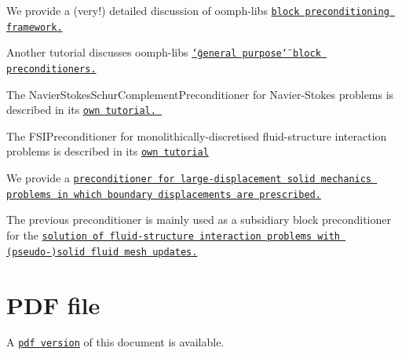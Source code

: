 \begin{DoxyItemize}
\item We provide a (very!) detailed discussion of {\ttfamily oomph-\/lib\textquotesingle{}s} \href{../../mpi/block_preconditioners/html/index.html}{\tt block preconditioning framework.} ~\newline
~\newline

\item Another tutorial discusses {\ttfamily oomph-\/lib\textquotesingle{}s} \href{../../mpi/distributed_general_purpose_block_preconditioners/html/index.html}{\tt \char`\"{}general purpose\char`\"{} block preconditioners.} ~\newline
~\newline

\item The Navier\+Stokes\+Schur\+Complement\+Preconditioner for Navier-\/\+Stokes problems is described in its \href{../../preconditioners/lsc_navier_stokes/html/index.html}{\tt own tutorial. } ~\newline
~\newline

\item The F\+S\+I\+Preconditioner for monolithically-\/discretised fluid-\/structure interaction problems is described in its \href{../../preconditioners/fsi/html/index.html}{\tt own tutorial} ~\newline
~\newline

\item We provide a \href{../../preconditioners/prescribed_displ_lagr_mult/html/index.html}{\tt preconditioner for large-\/displacement solid mechanics problems in which boundary displacements are prescribed.}~\newline
~\newline

\item The previous preconditioner is mainly used as a subsidiary block preconditioner for the \href{../../preconditioners/pseudo_solid_fsi/html/index.html}{\tt solution of fluid-\/structure interaction problems with (pseudo-\/)solid fluid mesh updates.} ~\newline
~\newline

\end{DoxyItemize}

 

 \hypertarget{index_pdf}{}\section{P\+D\+F file}\label{index_pdf}
A \href{../latex/refman.pdf}{\tt pdf version} of this document is available. 
